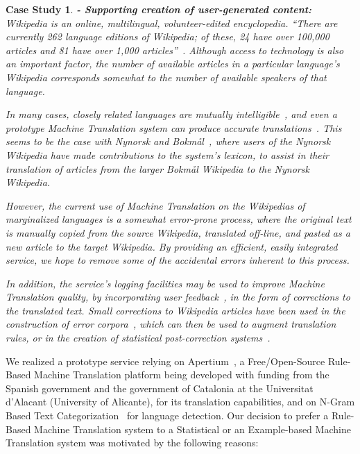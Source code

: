 \documentclass[11pt]{article}
\newtheorem{cs}{Case Study}
\begin{document}
\begin{cs}{\bf - Supporting creation of user-generated content:}
Wikipedia is an online, multilingual, volunteer-edited encyclopedia. ``There are currently 262 language editions of Wikipedia; of these, 24 have over 100,000 articles and 81 have over 1,000 articles''~\citep{wikipedia}. Although access to technology is also an important factor, the number of available articles in a particular language's Wikipedia corresponds somewhat to the number of available speakers of that language.

In many cases, closely related languages are mutually intelligible~\citep{tyers09a}, and even a prototype Machine Translation system can produce accurate translations~\citep{oller06}. This seems to be the case with Nynorsk and Bokmål~\citep{unhammer09}, where users of the Nynorsk Wikipedia have made contributions to the system's lexicon, to assist in their translation of articles from the larger Bokmål Wikipedia to the Nynorsk Wikipedia.

However, the current use of Machine Translation on the Wikipedias of marginalized languages is a somewhat error-prone process, where the original text is manually copied from the source Wikipedia, translated off-line, and pasted as a new article to the target Wikipedia. By providing an efficient, easily integrated service, we hope to remove some of the accidental errors inherent to this process.

In addition, the service's logging facilities may be used to improve Machine Translation quality, by incorporating user feedback~\citep{google}, in the form of corrections to the translated text. Small corrections to Wikipedia articles have been used in the construction of error corpora~\citep{milek08}, which can then be used to augment translation rules, or in the creation of statistical post-correction systems~\citep{dugast07}.
\end{cs}

We realized a prototype service relying on Apertium~\citep{armentano05p}, a Free/Open-Source Rule-Based Machine Translation platform being developed with funding from the Spanish government and the government of Catalonia at the Universitat d'Alacant (University of Alicante), for its translation capabilities, and on N-Gram Based Text Categorization~\citep{textcat} for language detection. Our decision to prefer a Rule-Based Machine Translation system to a Statistical or an Example-based Machine Translation system was motivated by the following reasons:
\end{document}
